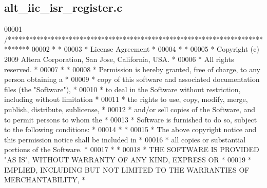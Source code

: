 \subsection{alt\+\_\+iic\+\_\+isr\+\_\+register.\+c}
\label{alt__iic__isr__register_8c_source}

\begin{DoxyCode}
00001 \textcolor{comment}{/******************************************************************************}
00002 \textcolor{comment}{*                                                                             *}
00003 \textcolor{comment}{* License Agreement                                                           *}
00004 \textcolor{comment}{*                                                                             *}
00005 \textcolor{comment}{* Copyright (c) 2009      Altera Corporation, San Jose, California, USA.      *}
00006 \textcolor{comment}{* All rights reserved.                                                        *}
00007 \textcolor{comment}{*                                                                             *}
00008 \textcolor{comment}{* Permission is hereby granted, free of charge, to any person obtaining a     *}
00009 \textcolor{comment}{* copy of this software and associated documentation files (the "Software"),  *}
00010 \textcolor{comment}{* to deal in the Software without restriction, including without limitation   *}
00011 \textcolor{comment}{* the rights to use, copy, modify, merge, publish, distribute, sublicense,    *}
00012 \textcolor{comment}{* and/or sell copies of the Software, and to permit persons to whom the       *}
00013 \textcolor{comment}{* Software is furnished to do so, subject to the following conditions:        *}
00014 \textcolor{comment}{*                                                                             *}
00015 \textcolor{comment}{* The above copyright notice and this permission notice shall be included in  *}
00016 \textcolor{comment}{* all copies or substantial portions of the Software.                         *}
00017 \textcolor{comment}{*                                                                             *}
00018 \textcolor{comment}{* THE SOFTWARE IS PROVIDED "AS IS", WITHOUT WARRANTY OF ANY KIND, EXPRESS OR  *}
00019 \textcolor{comment}{* IMPLIED, INCLUDING BUT NOT LIMITED TO THE WARRANTIES OF MERCHANTABILITY,    *}

\end{DoxyCode}
